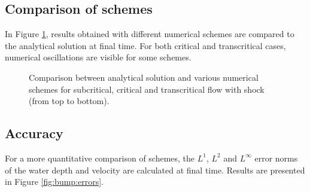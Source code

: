 \subsection{Comparison of schemes}
In Figure \ref{fig:bumpsub:fig:comp}, results obtained with different numerical schemes are compared to the analytical solution at final time. For both critical and transcritical cases, numerical oscillations are visible for some schemes.

\begin{figure}[H]
\begin{minipage}[t]{0.5\textwidth}
 \centering
\end{minipage}%
\begin{minipage}[t]{0.5\textwidth}
 \centering
\end{minipage}
\begin{minipage}[t]{0.5\textwidth}
 \centering
\end{minipage}%
\begin{minipage}[t]{0.5\textwidth}
 \centering
\end{minipage}
\begin{minipage}[t]{0.5\textwidth}
 \centering
\end{minipage}%
\begin{minipage}[t]{0.5\textwidth}
 \centering
\end{minipage}
 \caption{Comparison between analytical solution and various  numerical schemes
 for subcritical, critical and transcritical flow with shock (from top to bottom).}\label{fig:bumpsub:fig:comp}
\end{figure}

\subsection{Accuracy}

For a more quantitative comparison of schemes, the $L^1$, $L^2$ and $L^\infty$ error norms
of the water depth and velocity are calculated at final time.
Results are presented in Figure \ref{fig:bump:errors}.

